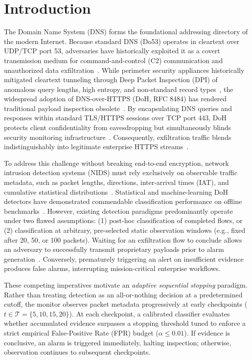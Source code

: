 \documentclass[conference]{IEEEtran}
\begin{document}
\section{Introduction}
The Domain Name System (DNS) forms the foundational addressing directory of the modern Internet. Because standard DNS (Do53) operates in cleartext over UDP/TCP port 53, adversaries have historically exploited it as a covert transmission medium for command-and-control (C2) communication and unauthorized data exfiltration~\cite{wang2021,liu2019,chowdhary2021,ding2021}. While perimeter security appliances historically mitigated cleartext tunneling through Deep Packet Inspection (DPI) of anomalous query lengths, high entropy, and non-standard record types~\cite{dangelo2022}, the widespread adoption of DNS-over-HTTPS (DoH, RFC 8484) has rendered traditional payload inspection obsolete~\cite{hynek2022}. By encapsulating DNS queries and responses within standard TLS/HTTPS sessions over TCP port 443, DoH protects client confidentiality from eavesdropping but simultaneously blinds security monitoring infrastructure~\cite{montazerishatoori2020}. Consequently, exfiltration traffic blends indistinguishably into legitimate enterprise HTTPS streams~\cite{salat2023}.

To address this challenge without breaking end-to-end encryption, network intrusion detection systems (NIDS) must rely exclusively on observable traffic metadata, such as packet lengths, directions, inter-arrival times (IAT), and cumulative statistical distributions~\cite{behnke2021}. Statistical and machine-learning DoH detectors have demonstrated commendable classification performance on offline benchmarks~\cite{moure,metc,abrahim2026,banadaki2020}. However, existing detection paradigms predominantly operate under two flawed assumptions: (1) post-hoc classification of completed flows, or (2) classification at arbitrary, pre-selected static observation windows (e.g., fixed after 20, 50, or 100 packets). Waiting for an exfiltration flow to conclude allows an adversary to successfully transmit proprietary payloads prior to alarm generation~\cite{salat2023}. Conversely, prematurely triggering an alert on insufficient evidence produces false alarms, interrupting mission-critical enterprise workflows. 

These competing imperatives motivate an \emph{adaptive sequential stopping} paradigm. Rather than treating detection as an all-or-nothing decision at a predetermined cutoff, the monitor observes packet metadata progressively at early checkpoints ($t \in \mathcal{T}=\{5, 10, 15, 20\}$). At each checkpoint, a calibrated classifier evaluates whether accumulated evidence surpasses a stopping threshold tuned to enforce a strict empirical False-Positive Rate (FPR) budget ($\alpha \le 0.01$). If evidence is conclusive, an alarm is triggered immediately, halting inspection; otherwise, observation continues to subsequent checkpoints.
\end{document}
